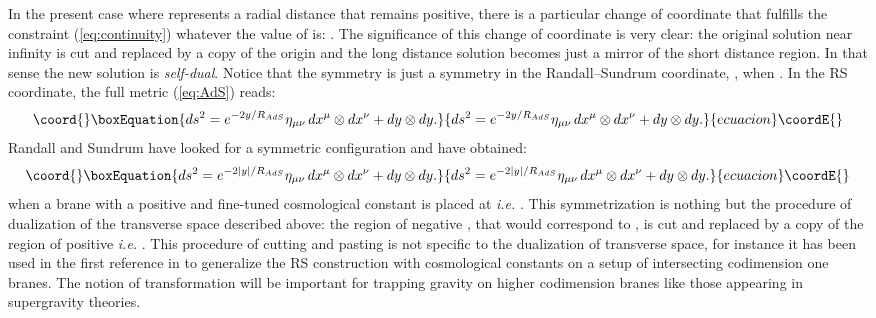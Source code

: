 \documentclass[a4paper,12pt]{article}
\def\Rads{R_{\scriptscriptstyle AdS}}
\begin{document}
%
In the present case where \coordHE{} represents a radial distance that remains
positive, there is a particular change of coordinate that fulfills the constraint
(\ref{eq:continuity}) whatever the value of \coordHE{} is: \coordHE{}.
The significance of this change of coordinate is very clear: the original solution
near infinity is cut and replaced by a copy of the origin and the long distance
solution becomes just a mirror of the short distance region. In that sense
the new solution is {\it {}\coordHE{} self-dual}. Notice that
the \coordHE{} symmetry
is just a \coordHE{} symmetry in the Randall--Sundrum coordinate,
\myHighlight{$y=- R \ln (r/\Rads)$}\coordHE{}, when \myHighlight{$r_\circ=\Rads$}\coordHE{}. In the RS coordinate, the full
\coordHE{} metric (\ref{eq:AdS}) reads:
%
\begin{equation}\coord{}\boxEquation{
	\label{RSAdS}
ds^2 = e^{-2 y/\Rads} \eta_{\mu\nu} \, dx^\mu \otimes dx^\nu
+ dy \otimes dy .
}{
	ds^2 = e^{-2 y/\Rads} \eta_{\mu\nu} \, dx^\mu \otimes dx^\nu
+ dy \otimes dy .
}{ecuacion}\coordE{}\end{equation}
%
Randall and Sundrum have looked for a \coordHE{} symmetric configuration and have
obtained:
%
\begin{equation}\coord{}\boxEquation{
ds^2 = e^{-2 |y|/\Rads} \eta_{\mu\nu} \, dx^\mu \otimes dx^\nu
+ dy \otimes dy .
}{
ds^2 = e^{-2 |y|/\Rads} \eta_{\mu\nu} \, dx^\mu \otimes dx^\nu
+ dy \otimes dy .
}{ecuacion}\coordE{}\end{equation}
%
when a brane with a positive and fine-tuned cosmological constant is placed at
\coordHE{} {\it i.e.} \myHighlight{$r=\Rads$}\coordHE{}. This  \coordHE{} symmetrization is nothing
but the procedure of \coordHE{} dualization of the transverse space described above:
the region of negative \coordHE{}, that would correspond to \myHighlight{$r\geq \Rads$}\coordHE{}, is cut
and replaced by a copy of the region of positive \coordHE{} {\it i.e.}
\myHighlight{$r\leq \Rads$}\coordHE{}. This procedure of cutting and pasting is not specific to
the \coordHE{} dualization of transverse space, for instance it has been used
in the first reference in \cite{intersections} to generalize the RS construction
with cosmological constants on a setup of intersecting codimension one
branes. The notion of \coordHE{} transformation will be important for trapping gravity
on higher codimension branes like those appearing in supergravity theories.
\end{document}
